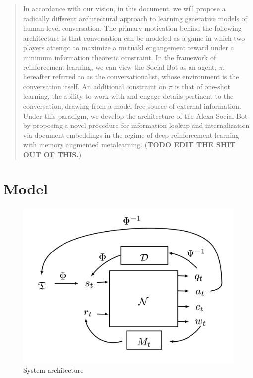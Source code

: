 \documentclass{article} %
\theoremstyle{named}
\begin{document}

\begin{abstract}
In accordance with our vision, in this document, we will propose a radically different architectural approach to learning generative models of human-level conversation. The primary motivation behind the following architecture is that conversation can be modeled as a game in which two players attempt to maximize a mutuakl engangement reward under a minimum information theoretic constraint. In the framework of reinforcement learning, we can view the Social Bot as an agent, $\pi$, hereafter referred to as the conversationalist, whose environment is the conversation itself. An additional constraint on $\pi$ is that of one-shot learning, the ability to work with and engage details pertinent to the conversation, drawing from a model free source of external information. Under this paradigm, we develop the architecture of the Alexa Social Bot by proposing a novel procedure for information lookup and internalization via document embeddings in the regime of deep reinforcement learning with memory augmented metalearning. (\textbf{TODO EDIT THE SHIT OUT OF THIS.})
\end{abstract}

\section{Model}
\begin{figure}[ht]
\vskip 0.2in
\begin{center}
\centerline{\includegraphics[width=\columnwidth]{jamesdiag}}
\caption{System architecture}
\label{icml-historical}
\end{center}
\vskip -0.2in
\end{figure}
%     
\end{document}
